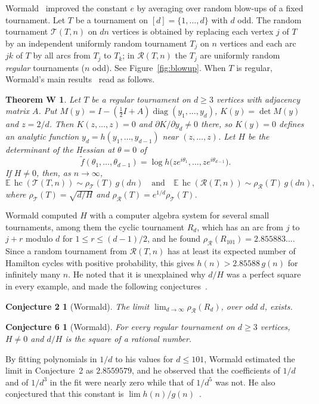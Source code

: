 \documentclass[11pt]{amsart}
\newtheorem*{conjTwo}{Conjecture 2}
\newtheorem*{conjSix}{Conjecture 6}
\newtheorem*{theoremW}{Theorem W}
\theoremstyle{remark}
\numberwithin{equation}{section}
\newcommand{\hc}{\operatorname{hc}}
\newcommand{\cT}{\mathcal{T}}
\newcommand{\cR}{\mathcal{R}}
\begin{document}
Wormald~\cite{W} improved the constant $e$ by averaging over random blow-ups of a fixed tournament. Let $T$ be a tournament on $[d]=\{1,\dots,d\}$ with $d$ odd. The random tournament $\cT(T,n)$ on $dn$ vertices is obtained by replacing each vertex $j$ of $T$ by an independent uniformly random tournament $T_j$ on $n$ vertices and each arc $jk$ of $T$ by all arcs from $T_j$ to $T_k$; in $\cR(T,n)$ the $T_j$ are uniformly random \emph{regular} tournaments ($n$ odd). See Figure~\ref{fig:blowup}. When $T$ is regular, Wormald's main results~\cite[Theorems~1 and~4]{W} read as follows.

\begin{theoremW}
Let $T$ be a regular tournament on $d\ge3$ vertices with adjacency matrix $A$. Put $M(y)=I-(\tfrac12I+A)\operatorname{diag}(y_1,\dots,y_d)$, $K(y)=\det M(y)$ and $z=2/d$. Then $K(z,\dots,z)=0$ and $\partial K/\partial y_d\neq0$ there, so $K(y)=0$ defines an analytic function $y_d=h(y_1,\dots,y_{d-1})$ near $(z,\dots,z)$. Let $H$ be the determinant of the Hessian at $\theta=0$ of
\[
\tilde f(\theta_1,\dots,\theta_{d-1})=\log h\bigl(ze^{i\theta_1},\dots,ze^{i\theta_{d-1}}\bigr).
\]
If $H\neq0$, then, as $n\to\infty$,
\[
\mathbb E\,\hc(\cT(T,n))\sim\rho_\cT(T)\,g(dn)\quad\text{and}\quad \mathbb E\,\hc(\cR(T,n))\sim\rho_\cR(T)\,g(dn),
\]
where $\rho_\cT(T)=\sqrt{d/H}$ and $\rho_\cR(T)=e^{1/d}\rho_\cT(T)$.
\end{theoremW}

Wormald computed $H$ with a computer algebra system for several small tournaments, among them the cyclic tournament $R_d$, which has an arc from $j$ to $j+r$ modulo $d$ for $1\le r\le (d-1)/2$, and he found $\rho_\cR(R_{101})=2.855883\ldots$. Since a random tournament from $\cR(T,n)$ has at least its expected number of Hamilton cycles with positive probability, this gives $h(n)>2.85588\,g(n)$ for infinitely many $n$. He noted that it is unexplained why $d/H$ was a perfect square in every example, and made the following conjectures~\cite[Conjectures~2 and~6]{W}.

\begin{conjTwo}[Wormald]
The limit $\lim_{d\to\infty}\rho_\cR(R_d)$, over odd $d$, exists.
\end{conjTwo}

\begin{conjSix}[Wormald]
For every regular tournament on $d\ge3$ vertices, $H\neq0$ and $d/H$ is the square of a rational number.
\end{conjSix}

By fitting polynomials in $1/d$ to his values for $d\le101$, Wormald estimated the limit in Conjecture~2 as $2.8559579$, and he observed that the coefficients of $1/d$ and of $1/d^3$ in the fit were nearly zero while that of $1/d^5$ was not. He also conjectured that this constant is $\lim h(n)/g(n)$~\cite[Conjecture~5]{W}.
\end{document}
